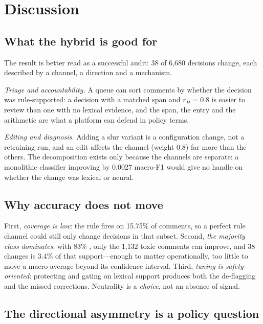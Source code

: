\section{Discussion}
\label{sec:discussion}

\subsection{What the hybrid is good for}
\label{sec:value}

The result is better read as a successful audit: 38 of 6{,}680 decisions change, each
described by a channel, a direction and a mechanism.

\emph{Triage and accountability.} A queue can sort comments by whether the decision was
rule-supported: a \hate{} decision with a matched span and $r_H=0.8$ is easier to review
than one with no lexical evidence, and the span, the entry and the arithmetic are what a
platform can defend in policy terms.

\emph{Editing and diagnosis.} Adding a slur variant is a configuration change, not a
retraining run, and an edit affects the \hate{} channel (weight 0.8) far more than the
others. The decomposition exists only because the channels are separate: a monolithic
classifier improving by 0.0027 macro-F1 would give no handle on whether the change was
lexical or neural.

\subsection{Why accuracy does not move}
\label{sec:why-neutral}

First, \emph{coverage is low}: the rule fires on 15.75\% of comments, so a perfect rule
channel could still only change decisions in that subset. Second, \emph{the majority
class dominates}: with 83\% \clean{}, only the 1{,}132 toxic comments can improve, and 38
changes is 3.4\% of that support---enough to matter operationally, too little to move a
macro-average beyond its confidence interval. Third, \emph{tuning is safety-oriented}:
protecting \clean{} and gating \hate{} on lexical support produces both the de-flagging
and the missed corrections. Neutrality is a \emph{choice}, not an absence of signal.

\subsection{The directional asymmetry is a policy question}
\label{sec:asymmetry}

